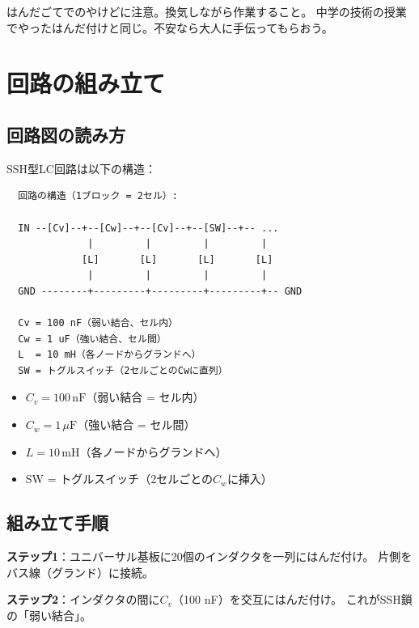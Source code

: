 \documentclass[12pt,a4paper]{article}
\begin{document}
\begin{warnbox}
はんだごてでのやけどに注意。換気しながら作業すること。
中学の技術の授業でやったはんだ付けと同じ。不安なら大人に手伝ってもらおう。
\end{warnbox}

\section{回路の組み立て}

\subsection{回路図の読み方}

SSH型LC回路は以下の構造：

\begin{verbatim}
  回路の構造（1ブロック = 2セル）:

  IN --[Cv]--+--[Cw]--+--[Cv]--+--[SW]--+-- ...
              |         |         |         |
             [L]       [L]       [L]       [L]
              |         |         |         |
  GND --------+---------+---------+---------+-- GND

  Cv = 100 nF（弱い結合、セル内）
  Cw = 1 uF（強い結合、セル間）
  L  = 10 mH（各ノードからグランドへ）
  SW = トグルスイッチ（2セルごとのCwに直列）
\end{verbatim}

\begin{itemize}
\item $C_v = 100\,\mathrm{nF}$（弱い結合 = セル内）
\item $C_w = 1\,\mu\mathrm{F}$（強い結合 = セル間）
\item $L = 10\,\mathrm{mH}$（各ノードからグランドへ）
\item SW = トグルスイッチ（2セルごとの$C_w$に挿入）
\end{itemize}

\subsection{組み立て手順}

\textbf{ステップ1}：ユニバーサル基板に20個のインダクタを一列にはんだ付け。
片側をバス線（グランド）に接続。

\textbf{ステップ2}：インダクタの間に$C_v$（100 nF）を交互にはんだ付け。
これがSSH鎖の「弱い結合」。
\end{document}
